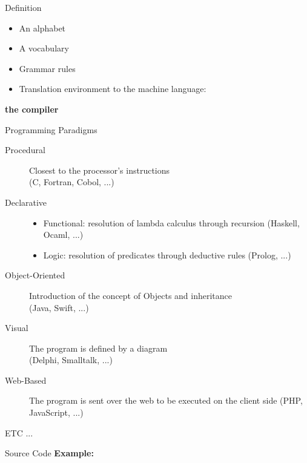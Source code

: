 \begin{frame}{Definition}
    \begin{itemize}
        \item An alphabet
        \item A vocabulary
        \item Grammar rules
        \item Translation environment to the machine language: 
    \end{itemize}
    \begin{center}
        \textbf{the compiler}
    \end{center}
\end{frame}

\begin{frame}{Programming Paradigms}
    \begin{description}
        \item [Procedural] Closest to the processor's instructions 
                        \\(C, Fortran, Cobol, ...)
        \item [Declarative]
        \begin{itemize}
            \item Functional: resolution of lambda calculus through recursion (Haskell, Ocaml, ...)
            \item Logic: resolution of predicates through deductive rules (Prolog, ...)
        \end{itemize}
        \item [Object-Oriented] Introduction of the concept of Objects and inheritance 
                            \\(Java, Swift, ...)
        \item [Visual] The program is defined by a diagram 
                    \\(Delphi, Smalltalk, ...)
        \item [Web-Based] The program is sent over the web to be executed on the client side (PHP, JavaScript, ...)
        \item [ETC ...]
    \end{description}
\end{frame}

\begin{frame}{Source Code}
    \textbf{Example:}
\end{frame}